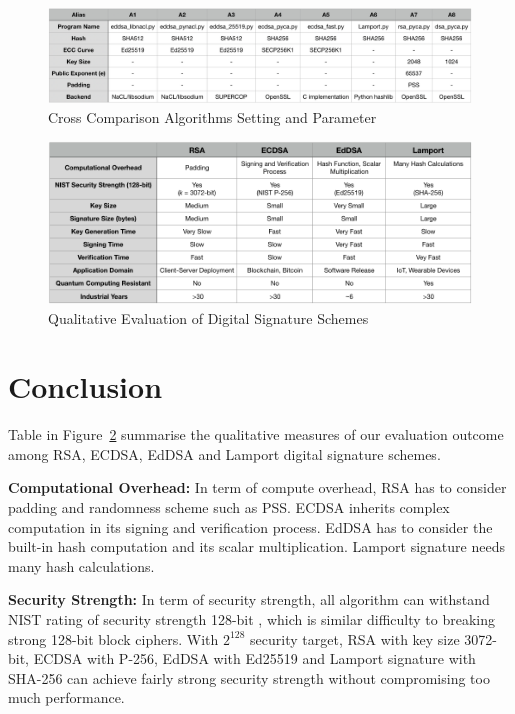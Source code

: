 \documentclass[10pt,sigconf]{acmart}
\begin{document}
\begin{figure}
\centering
\includegraphics[scale=0.4]{Cross_Compare_Label.png}
\caption{\small{Cross Comparison Algorithms Setting and Parameter}}
\label{fig:Cross_Compare_Label}
\end{figure}

\begin{figure}
\centering
\includegraphics[scale=0.45]{Qualitative_Evaluation}
\caption{\small{Qualitative Evaluation of Digital Signature Schemes}}
\label{fig:Qualitative_Evaluation}
\end{figure}

\section{Conclusion}

Table in Figure~\ref{fig:Qualitative_Evaluation} summarise the qualitative measures of our evaluation outcome among RSA, ECDSA, EdDSA and Lamport digital signature schemes. 

\noindent \textbf{Computational Overhead:} \quad In term of compute overhead, RSA has to consider padding and randomness scheme such as PSS. ECDSA inherits complex computation in its signing and verification process. EdDSA has to consider the built-in hash computation and its scalar multiplication. Lamport signature needs many hash calculations.

\noindent \textbf{Security Strength:} \quad In term of security strength, all algorithm can withstand NIST rating of security strength 128-bit \cite{nistKeysizes}, which is similar difficulty to breaking strong 128-bit block ciphers. With $2^{128}$ security target, RSA with key size 3072-bit, ECDSA with P-256, EdDSA with Ed25519 and Lamport signature with SHA-256 can achieve fairly strong security strength without compromising too much performance.
\end{document}

